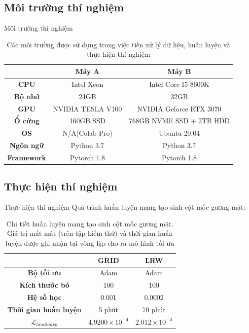 \subsection{Môi trường thí nghiệm}
\begin{frame}{Môi trường thí nghiệm}
\begin{table}[h]
    \centering
    \begin{tabular}{c | c | c}
    \hline 
    &\textbf{Máy A} & \textbf{Máy B}\\
    \hline
    \textbf{CPU} & Intel Xeon & Intel Core I5 8600K\\
    \textbf{Bộ nhớ} & 24GB & 32GB\\
    \textbf{GPU} & NVIDIA TESLA V100 & NVIDIA Geforce RTX 3070\\
    \textbf{Ổ cứng} & 160GB SSD & 768GB NVME SSD + 2TB HDD\\
    \textbf{OS} & N/A(Colab Pro) & Ubuntu 20.04\\
    \textbf{Ngôn ngữ} & Python 3.7 & Python 3.7\\
    \textbf{Framework} & Pytorch 1.8 & Pytorch 1.8\\
    \hline
    \end{tabular}
    \caption{Các môi trường được sử dụng trong việc tiền xử lý dữ liệu, huấn luyện và thực hiện thí nghiệm}
    \label{table:hardware}
\end{table}
\end{frame}

\subsection{Thực hiện thí nghiệm}
\begin{frame}{Thực hiện thí nghiệm}
Quá trình huấn luyện mạng tạo sinh cột mốc gương mặt:
\begin{table}[h]
    \centering
    \begin{tabular}{c | c | c}
    \hline 
    &\textbf{GRID} & \textbf{LRW}\\
    \hline
    \textbf{Bộ tối ưu} & Adam & Adam\\
    \textbf{Kích thước bó} & 100 & 100\\
    \textbf{Hệ số học} & 0.001 & 0.0002\\
    \textbf{Thời gian huấn luyện} & 5 phút & 70 phút\\
    \textbf{$\mathcal{L}_{landmark}$} & $4.9200 \times 10^{-4}$ & $2.012 \times 10^{-4}$\\
    \hline
    \end{tabular}
    \caption{Chi tiết huấn luyện mạng tạo sinh cột mốc gương mặt. Giá trị mất mát (trên tập kiểm thử) và thời gian huấn luyện được ghi nhận tại vòng lặp cho ra mô hình tối ưu}
    \label{table:landmark_decoder_training_detail}
\end{table}
\end{frame}

